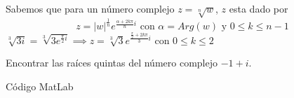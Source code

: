\documentclass[twoside]{book}
\begin{document}
\begin{sol}
    \begin{solucion}{}
        Sabemos que para un número complejo $z=\sqrt[n]{w}$, $z$ esta dado por $$z=|w|^{\frac{1}{n}}e^{\frac{\alpha+2k\pi}{n}i} \text{ con } \alpha=Arg(w) \text{ y } 0\leq k\leq n-1$$
        $\sqrt[3]{3i}=\sqrt[3]{3e^{\frac{\pi}{2}i}} \implies z=\sqrt[3]{3}e^{\frac{\frac{\pi}{2}+2k\pi}{3}i} \text{ con } 0\leq k\leq 2$

    \end{solucion}
\end{sol}
\begin{example}{}
    Encontrar las ra\'ices quintas del n\'umero complejo $-1+i$.
\end{example}
\begin{sol}
    \begin{solucion}{C\'odigo MatLab}
    \end{solucion}
\end{sol}
\end{document}

